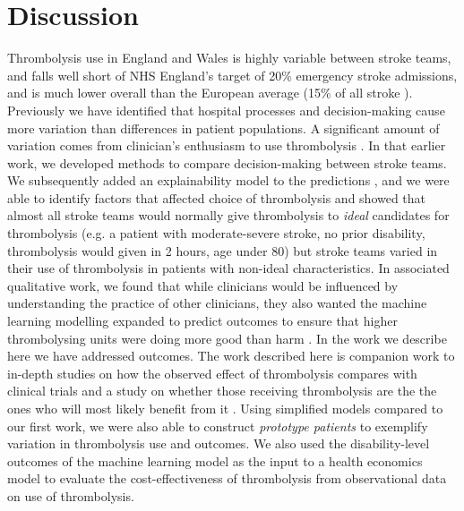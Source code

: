\section{Discussion}

Thrombolysis use in England and Wales is highly variable between stroke teams, and falls well short of NHS England's target of 20\% emergency stroke admissions, and is much lower overall than the European average (15\% of all stroke \cite{aguiar_de_sousa_delivery_2023}). Previously we have identified that hospital processes and decision-making cause more variation than differences in patient populations. A significant amount of variation comes from clinician's enthusiasm to use thrombolysis \cite{allen_use_2022, allen_using_2022}. In that earlier work, we developed methods to compare decision-making between stroke teams. We subsequently added an explainability model to the predictions \cite{pearn_what_2023}, and we were able to identify factors that affected choice of thrombolysis and showed that almost all stroke teams would normally give thrombolysis to \textit{ideal} candidates for thrombolysis (e.g. a patient with moderate-severe stroke, no prior disability, thrombolysis would given in 2 hours, age under 80) but stroke teams varied in their use of thrombolysis in patients with non-ideal characteristics. In associated qualitative work, we found that while clinicians would be influenced by understanding the practice of other clinicians, they also wanted the machine learning modelling expanded to predict outcomes to ensure that higher thrombolysing units were doing more good than harm \cite{allen_using_2022}. In the work we describe here we have addressed outcomes. The work described here is companion work to in-depth studies on how the observed effect of thrombolysis compares with clinical trials \cite{pearn_thrombolysis_2024} and a study on whether those receiving thrombolysis are the the ones who will most likely benefit from it \cite{pearn_are_2024}. Using simplified models compared to our first work, we were also able to construct \textit{prototype patients} to exemplify variation in thrombolysis use and outcomes. We also used the disability-level outcomes of the machine learning model as the input to a health economics model to evaluate the cost-effectiveness of thrombolysis from observational data on use of thrombolysis.

